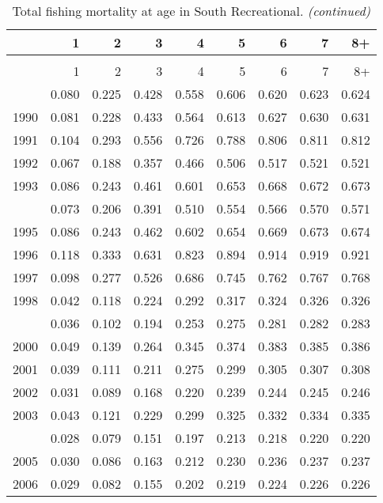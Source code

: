 \documentclass[
]{article}
\begin{document}
\begin{longtable}[t]{lrrrrrrrr}
\caption{\label{tab:South_Recreational-fleet-FAA-table}Total fishing mortality at age in South Recreational.}\\
\toprule
  & 1 & 2 & 3 & 4 & 5 & 6 & 7 & 8+\\
\midrule
\endfirsthead
\caption[]{Total fishing mortality at age in South Recreational. \textit{(continued)}}\\
\toprule
  & 1 & 2 & 3 & 4 & 5 & 6 & 7 & 8+\\
\midrule
\endhead

\endfoot
\bottomrule
\endlastfoot
1989 & 0.080 & 0.225 & 0.428 & 0.558 & 0.606 & 0.620 & 0.623 & 0.624\\
1990 & 0.081 & 0.228 & 0.433 & 0.564 & 0.613 & 0.627 & 0.630 & 0.631\\
1991 & 0.104 & 0.293 & 0.556 & 0.726 & 0.788 & 0.806 & 0.811 & 0.812\\
1992 & 0.067 & 0.188 & 0.357 & 0.466 & 0.506 & 0.517 & 0.521 & 0.521\\
1993 & 0.086 & 0.243 & 0.461 & 0.601 & 0.653 & 0.668 & 0.672 & 0.673\\
\addlinespace
1994 & 0.073 & 0.206 & 0.391 & 0.510 & 0.554 & 0.566 & 0.570 & 0.571\\
1995 & 0.086 & 0.243 & 0.462 & 0.602 & 0.654 & 0.669 & 0.673 & 0.674\\
1996 & 0.118 & 0.333 & 0.631 & 0.823 & 0.894 & 0.914 & 0.919 & 0.921\\
1997 & 0.098 & 0.277 & 0.526 & 0.686 & 0.745 & 0.762 & 0.767 & 0.768\\
1998 & 0.042 & 0.118 & 0.224 & 0.292 & 0.317 & 0.324 & 0.326 & 0.326\\
\addlinespace
1999 & 0.036 & 0.102 & 0.194 & 0.253 & 0.275 & 0.281 & 0.282 & 0.283\\
2000 & 0.049 & 0.139 & 0.264 & 0.345 & 0.374 & 0.383 & 0.385 & 0.386\\
2001 & 0.039 & 0.111 & 0.211 & 0.275 & 0.299 & 0.305 & 0.307 & 0.308\\
2002 & 0.031 & 0.089 & 0.168 & 0.220 & 0.239 & 0.244 & 0.245 & 0.246\\
2003 & 0.043 & 0.121 & 0.229 & 0.299 & 0.325 & 0.332 & 0.334 & 0.335\\
\addlinespace
2004 & 0.028 & 0.079 & 0.151 & 0.197 & 0.213 & 0.218 & 0.220 & 0.220\\
2005 & 0.030 & 0.086 & 0.163 & 0.212 & 0.230 & 0.236 & 0.237 & 0.237\\
2006 & 0.029 & 0.082 & 0.155 & 0.202 & 0.219 & 0.224 & 0.226 & 0.226\\

\end{longtable}
\end{document}
